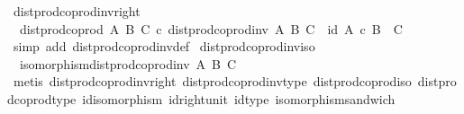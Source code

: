 \begin{isabellebody}
{\isafoldproof}%
%
\isadelimproof
\isanewline
%
\endisadelimproof
\isanewline
{}\isamarkupfalse%
\ dist{\isacharunderscore}{\kern0pt}prod{\isacharunderscore}{\kern0pt}coprod{\isacharunderscore}{\kern0pt}inv{\isacharunderscore}{\kern0pt}right{\isacharcolon}{\kern0pt}\isanewline
\ \ {\isachardoublequoteopen}dist{\isacharunderscore}{\kern0pt}prod{\isacharunderscore}{\kern0pt}coprod\ A\ B\ C\ {\isasymcirc}\isactrlsub c\ dist{\isacharunderscore}{\kern0pt}prod{\isacharunderscore}{\kern0pt}coprod{\isacharunderscore}{\kern0pt}inv\ A\ B\ C\ {\isacharequal}{\kern0pt}\ id\ {\isacharparenleft}{\kern0pt}A\ {\isasymtimes}\isactrlsub c\ {\isacharparenleft}{\kern0pt}B\ {\isasymCoprod}\ C{\isacharparenright}{\kern0pt}{\isacharparenright}{\kern0pt}{\isachardoublequoteclose}\isanewline
%
\isadelimproof
\ \ %
\endisadelimproof
%
\isatagproof
{}\isamarkupfalse%
\ {\isacharparenleft}{\kern0pt}simp\ add{\isacharcolon}{\kern0pt}\ dist{\isacharunderscore}{\kern0pt}prod{\isacharunderscore}{\kern0pt}coprod{\isacharunderscore}{\kern0pt}inv{\isacharunderscore}{\kern0pt}def{}{\isacharparenright}{\kern0pt}%
\endisatagproof
{\isafoldproof}%
%
\isadelimproof
\isanewline
%
\endisadelimproof
\isanewline
{}\isamarkupfalse%
\ dist{\isacharunderscore}{\kern0pt}prod{\isacharunderscore}{\kern0pt}coprod{\isacharunderscore}{\kern0pt}inv{\isacharunderscore}{\kern0pt}iso{\isacharcolon}{\kern0pt}\isanewline
\ \ {\isachardoublequoteopen}isomorphism{\isacharparenleft}{\kern0pt}dist{\isacharunderscore}{\kern0pt}prod{\isacharunderscore}{\kern0pt}coprod{\isacharunderscore}{\kern0pt}inv\ A\ B\ C{\isacharparenright}{\kern0pt}{\isachardoublequoteclose}\isanewline
%
\isadelimproof
\ \ %
\endisadelimproof
%
\isatagproof
{}\isamarkupfalse%
\ {\isacharparenleft}{\kern0pt}metis\ dist{\isacharunderscore}{\kern0pt}prod{\isacharunderscore}{\kern0pt}coprod{\isacharunderscore}{\kern0pt}inv{\isacharunderscore}{\kern0pt}right\ dist{\isacharunderscore}{\kern0pt}prod{\isacharunderscore}{\kern0pt}coprod{\isacharunderscore}{\kern0pt}inv{\isacharunderscore}{\kern0pt}type\ dist{\isacharunderscore}{\kern0pt}prod{\isacharunderscore}{\kern0pt}coprod{\isacharunderscore}{\kern0pt}iso\ dist{\isacharunderscore}{\kern0pt}prod{\isacharunderscore}{\kern0pt}coprod{\isacharunderscore}{\kern0pt}type\ id{\isacharunderscore}{\kern0pt}isomorphism\ id{\isacharunderscore}{\kern0pt}right{\isacharunderscore}{\kern0pt}unit{}\ id{\isacharunderscore}{\kern0pt}type\ isomorphism{\isacharunderscore}{\kern0pt}sandwich{\isacharparenright}{\kern0pt}%
\endisatagproof
{\isafoldproof}%

\end{isabellebody}
